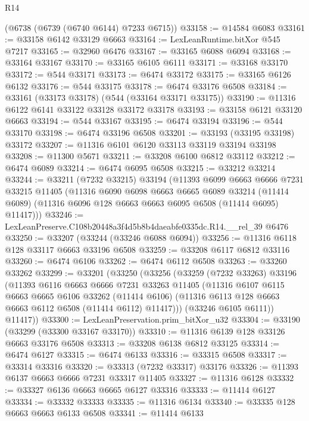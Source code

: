 \begin{lexlean}{R14}
\begin{coremodule}
    (@6738 (@6739 (@6740 @6144) @7233 @6715))
@33158 := @14584 @6083
@33161 := @33158 @6142 @33129 @6663
@33164 := LexLeanRuntime.bitXor @545 @7217
@33165 := @32960 @6476
@33167 := @33165 @6088 @6094
@33168 := @33164 @33167
@33170 := @33165 @6105 @6111
@33171 := @33168 @33170
@33172 := @544 @33171
@33173 := @6474 @33172
@33175 := @33165 @6126 @6132
@33176 := @544 @33175
@33178 := @6474 @33176 @6508
@33184 := @33161 (@33173 @33178) (@544 (@33164 @33171 @33175))
@33190 := @11316 @6122 @6141 @33122 @33128 @33172 @33178
@33193 := @33158 @6121 @33120 @6663
@33194 := @544 @33167
@33195 := @6474 @33194
@33196 := @544 @33170
@33198 := @6474 @33196 @6508
@33201 := @33193 (@33195 @33198) @33172
@33207 := @11316 @6101 @6120 @33113 @33119 @33194 @33198
@33208 := @11300 @5671
@33211 := @33208 @6100 @6812 @33112
@33212 := @6474 @6089
@33214 := @6474 @6095 @6508
@33215 := @33212 @33214
@33244 := @33211
    (@7232 @33215)
    @33194
    (@11393
      @6099
      @6663
      @6666
      @7231
      @33215
      @11405
      (@11316
        @6090
        @6098
        @6663
        @6665
        @6089
        @33214
        (@11414 @6089)
        (@11316 @6096 @128 @6663 @6663 @6095 @6508 (@11414 @6095) @11417)))
@33246 := LexLeanPreserve.C108b20448a3f4d5b8b4daeabfe0335dc.R14.__rel_39 @6476
@33250 := @33207 (@33244 (@33246 @6088 @6094))
@33256 := @11316 @6118 @128 @33117 @6663 @33196 @6508
@33259 := @33208 @6117 @6812 @33116
@33260 := @6474 @6106
@33262 := @6474 @6112 @6508
@33263 := @33260 @33262
@33299 := @33201
    (@33250
      (@33256
        (@33259
          (@7232 @33263)
          @33196
          (@11393
            @6116
            @6663
            @6666
            @7231
            @33263
            @11405
            (@11316
              @6107
              @6115
              @6663
              @6665
              @6106
              @33262
              (@11414 @6106)
              (@11316 @6113 @128 @6663 @6663 @6112 @6508 (@11414 @6112) @11417)))
          (@33246 @6105 @6111))
        @11417))
@33300 := LexLeanPreservation.prim_bitXor_u32
@33304 := @33190 (@33299 (@33300 @33167 @33170))
@33310 := @11316 @6139 @128 @33126 @6663 @33176 @6508
@33313 := @33208 @6138 @6812 @33125
@33314 := @6474 @6127
@33315 := @6474 @6133
@33316 := @33315 @6508
@33317 := @33314 @33316
@33320 := @33313 (@7232 @33317) @33176
@33326 := @11393 @6137 @6663 @6666 @7231 @33317 @11405
@33327 := @11316 @6128
@33332 := @33327 @6136 @6663 @6665 @6127 @33316
@33333 := @11414 @6127
@33334 := @33332 @33333
@33335 := @11316 @6134
@33340 := @33335 @128 @6663 @6663 @6133 @6508
@33341 := @11414 @6133

\end{coremodule}
\end{lexlean}
